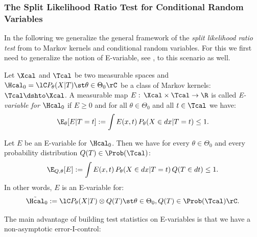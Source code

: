 \subsubsection{The Split Likelihood Ratio Test for Conditional Random Variables}

In the following we generalize the general framework of the \emph{split likelihood ratio test} from \cite{WRB20} to Markov kernels and conditional random variables. For this we first need to generalize the notion of E-variable, see \cite{GHK20}, to this scenario as well.

\begin{Def}[E-variable]
    \label{def:e-variable}
    Let $\Xcal$ and $\Tcal$ be two measurable spaces and $\Hcal_0=\lC P_\theta(X|T) \st \theta \in \Theta_0 \rC$
    be a class of Markov kernels: $\Tcal \dshto \Xcal$.
    A measurable map $E:\, \Xcal \times \Tcal \to \R$ is called \emph{E-variable for $\Hcal_0$} if $E \ge 0$ and 
    for all $\theta \in \Theta_0$ and all $t \in \Tcal$ we have:
    \[ \E_\theta[E|T=t] :=  \int E(x,t) \, P_\theta(X \in dx|T=t) \le 1.   \]
\end{Def}

\begin{Rem}
    Let $E$ be an E-variable for $\Hcal_0$. 
    Then we have for every $\theta \in \Theta_0$ and every probability distribution $Q(T) \in \Prob(\Tcal)$:
    \[ \E_{Q,\theta}[E] :=  \int E(x,t) \, P_\theta(X \in dx|T=t) \, Q(T \in dt) \le 1.   \]
    In other words, $E$ is an E-variable for:
    \[\tilde \Hcal_0 := \lC P_\theta(X|T)\otimes Q(T) \st \theta \in \Theta_0, Q(T) \in \Prob(\Tcal) \rC.\]
\end{Rem}

The main advantage of building test statistics on E-variables is that we have a non-asymptotic error-I-control:

